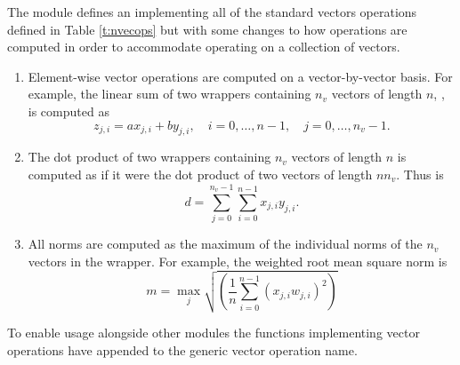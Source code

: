 The {\nvecwrap} module defines an  implementing all of the
standard vectors operations defined in Table \ref{t:nvecops} but with some
changes to how operations are computed in order to accommodate operating on a
collection of vectors.
\begin{enumerate}

\item Element-wise vector operations are computed on a vector-by-vector basis. For
example, the linear sum of two wrappers containing $n_v$ vectors of length $n$,
, is computed as
\begin{equation*}
z_{j,i} = a x_{j,i} + b y_{j,i}, \quad i=0,\ldots,n-1, \quad j=0,\ldots,n_v-1.
\end{equation*}

\item The dot product of two wrappers containing $n_v$ vectors of length $n$ is
computed as if it were the dot product of two vectors of length $n n_v$.
Thus  is
\begin{equation*}
d = \sum_{j=0}^{n_v-1} \sum_{i=0}^{n-1} x_{j,i} y_{j,i}.
\end{equation*}

\item All norms are computed as the maximum of the individual norms of the $n_v$ vectors
in the wrapper. For example, the weighted root mean square norm
 is
\begin{equation*}
m = \max_{j} \sqrt{ \left( \frac1n \sum_{i=0}^{n-1} \left(x_{j,i}
w_{j,i}\right)^2\right) }
\end{equation*}

\end{enumerate}
To enable usage alongside other {\nvector} modules the {\nvecwrap} functions
implementing vector operations have  appended to the
generic vector operation name.

